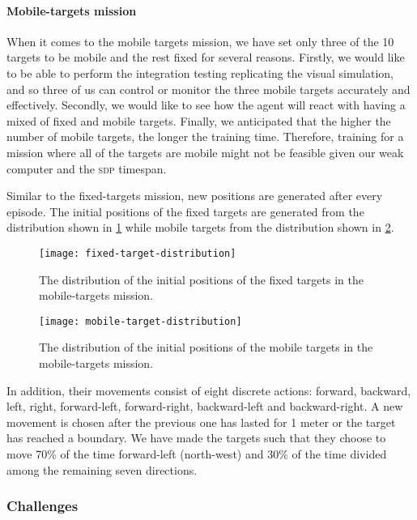\documentclass[../main.tex]{subfiles}
\begin{document}
\paragraph{Mobile-targets mission}

When it comes to the mobile targets mission, we have set only three of
the 10 targets to be mobile and the rest fixed for several reasons.
Firstly, we would like to be able to perform the integration testing
replicating the visual simulation, and so three of us can control or
monitor the three mobile targets accurately and effectively.
Secondly, we would like to see how the agent will react with having a
mixed of fixed and mobile targets.
Finally, we anticipated that the higher the number of mobile targets, the 
longer the training time. 
Therefore, training for a mission where all of the targets are mobile
might not be feasible given our weak computer and the \textsc{sdp}
timespan.

Similar to the fixed-targets mission,
new positions are generated after every episode.
The initial positions of the fixed targets are generated from 
the distribution shown in
\cref{fig:fixed-position-distribution}
while mobile targets from the distribution shown in
\cref{fig:mobile-position-distribution}.

\begin{figure}[!t]
	\centering
        \texttt{[image: fixed-target-distribution]}
	\caption{The distribution of the initial positions of the
        fixed targets in the mobile-targets mission.}
	\label{fig:fixed-position-distribution}
\end{figure}

\begin{figure}[!t]
	\centering
	\texttt{[image: mobile-target-distribution]}
	\caption{The distribution of the initial positions of the
            mobile targets in the mobile-targets mission.}
	\label{fig:mobile-position-distribution}
\end{figure}

In addition, their movements consist of eight discrete
actions: forward, backward, left, right,
forward-left, forward-right, backward-left and backward-right.
A new movement is chosen after the previous one has lasted for 1 meter
or the target has reached a boundary.
We have made the targets such that they choose to move 70\% 
of the time forward-left (north-west) and 30\% of the time divided
among the remaining seven directions.

\subsubsection{Challenges}
\end{document}
